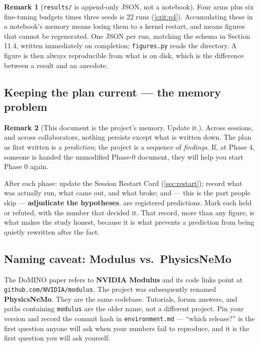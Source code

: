 \documentclass[10pt,a4paper]{article}
\theoremstyle{definition}
\newtheorem{remark}{Remark}[section]
\begin{document}
\begin{remark}[\texttt{results/} is append-only JSON, not a notebook]
\label{rem:results}
Four arms plus six fine-tuning budgets times three seeds is 22 runs
(\cref{crit:p4}). Accumulating these in a notebook's memory means losing them to a
kernel restart, and means figures that cannot be regenerated. One JSON per run, matching
the schema in Section 11.4, written immediately on completion; \texttt{figures.py} reads
the directory. A figure is then always reproducible from what is on disk, which is
the difference between a result and an anecdote.
\end{remark}

\subsection{Keeping the plan current --- the memory problem}
\label{sec:memory}

\begin{remark}[This document is the project's memory. Update it.]
Across sessions, and across collaborators, nothing persists except what is written
down. The plan as first written is a \emph{prediction}; the project is a sequence of
\emph{findings}. If, at Phase 4, someone is handed the unmodified Phase-0 document,
they will help you start Phase 0 again.

After each phase: update the Session Restart Card (\cref{sec:restart}); record what was
actually run, what came out, and what broke; and --- this is the part people skip ---
\textbf{adjudicate the hypotheses}.
are registered predictions. Mark each held or refuted, with the number that decided it.
That record, more than any figure, is what makes the study honest, because it is what
prevents a prediction from being quietly rewritten after the fact.
\end{remark}

\subsection{Naming caveat: Modulus vs.\ PhysicsNeMo}

The DoMINO paper refers to \textbf{NVIDIA Modulus} and its code links point at
\texttt{github.com/NVIDIA/modulus}. The project was subsequently renamed
\textbf{PhysicsNeMo}. They are the same codebase. Tutorials, forum answers, and paths
containing \texttt{modulus} are the older name, not a different project. Pin your
version and record the commit hash in \texttt{environment.md} --- ``which release?'' is
the first question anyone will ask when your numbers fail to reproduce, and it is the
first question you will ask yourself.
\end{document}
